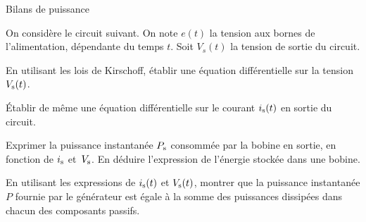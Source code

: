 \begin{exo}[MPSI]{Bilans de puissance}

On considère le circuit suivant. On note $e(t)$ la tension aux bornes de l'alimentation, dépendante du temps $t$. Soit $V_s(t)$ la tension de sortie du circuit.

\begin{center}

\end{center}

\begin{quest}

 \item En utilisant les lois de Kirschoff, établir une équation différentielle sur la tension $V_{\rm s}(t)$.

 \sol{

 }

\item Établir de même une équation différentielle sur le courant $i_{\rm s}(t)$ en sortie du circuit.

\item Exprimer la puissance instantanée $P_{\rm s}$ consommée par la bobine en sortie, en fonction de $i_{\rm s}$ et~$V_{\rm s}$. En déduire l'expression de l'énergie stockée dans une bobine.

\item En utilisant les expressions de $i_{\rm s}(t)$ et $V_{\rm s}(t)$, montrer que la puissance instantanée $P$ fournie par le générateur est égale à la somme des puissances dissipées dans chacun des composants passifs.


\end{quest}

\end{exo}


